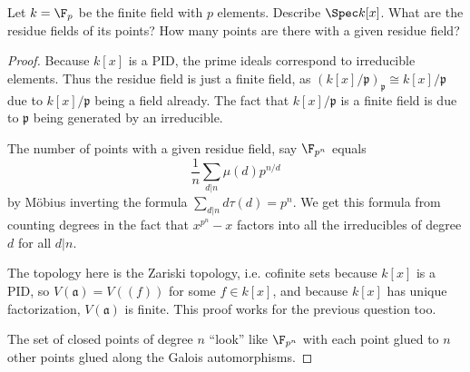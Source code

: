 \begin{exercise}
	Let $ k = \F_p $ be the finite field with $p $ elements. Describe $\Spec k[x] $. What are the residue fields of its points? How many points are there with a given residue field?
\end{exercise}
\begin{proof}
	Because $k[x] $ is a PID, the prime ideals correspond to irreducible elements.
	Thus the residue field is just a finite field, as $(k[x] / \mathfrak{p})_{\mathfrak{p}} \cong k[x] / \mathfrak{p}$ due to $k[x] / \mathfrak{p} $ being a field already.
	The fact that $k[x] / \mathfrak{p} $ is a finite field is due to $\mathfrak{p} $ being generated by an irreducible.

	The number of points with a given residue field, say $\F_{p^n} $ equals
	\[
		\frac{1}{n}\sum_{d | n} \mu(d) p^{n / d}
	\]
	by M\"obius inverting the formula $\sum_{d | n} d\tau (d) = p^n $.
	We get this formula from counting degrees in the fact that $x^{p^n} - x  $ factors into all the irreducibles of degree $d $ for all $d|n $.

	The topology here is the Zariski topology, i.e. cofinite sets because $k[x] $ is a PID, so $V(\mathfrak{a}) = V((f)) $ for some $f \in k[x] $, and because $k[x] $ has unique factorization, $V(\mathfrak{a}) $ is finite.
	This proof works for the previous question too.

	The set of closed points of degree $n $ ``look'' like $\F_{p^n} $ with each point glued to $n $ other points glued along the Galois automorphisms.
\end{proof}

